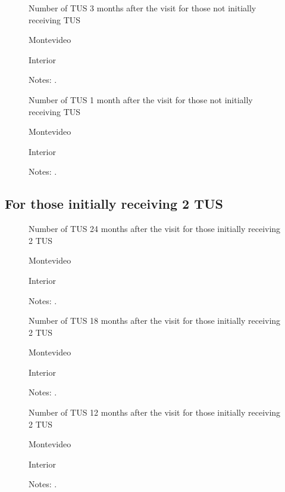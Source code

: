 \documentclass[12pt]{article}
\begin{document}
\begin{figure}[H]%
	\caption{Number of TUS 3 months after the visit for those not initially receiving TUS}%
	\centering
	\caption*{ {Montevideo}}
	\qquad
	\caption*{Interior}
	\label{fig:first_stage_si1Tus_tus3}%
	\caption*{ {\footnotesize Notes: .}}
\end{figure}

\begin{figure}[H]%
	\caption{Number of TUS 1 month after the visit for those not initially receiving TUS}%
	\centering
	\caption*{ {Montevideo}}
	\qquad
	\caption*{Interior}
	\label{fig:first_stage_si1Tus_tus1}%
	\caption*{ {\footnotesize Notes: .}}
\end{figure}

\subsection{For those initially receiving 2 TUS}

\begin{figure}[H]%
	\caption{Number of TUS 24 months after the visit for those initially receiving 2 TUS}%
	\centering
	\caption*{ {Montevideo}}
	\qquad
	\caption*{Interior}
	\label{fig:first_stage_si2Tus_tus24}%
	\caption*{ {\footnotesize Notes: .}}
\end{figure}

\begin{figure}[H]%
	\caption{Number of TUS 18 months after the visit for those initially receiving 2 TUS}%
	\centering
	\caption*{ {Montevideo}}
	\qquad
	\caption*{Interior}
	\label{fig:first_stage_si2Tus_tus18}%
	\caption*{ {\footnotesize Notes: .}}
\end{figure}

\begin{figure}[H]%
	\caption{Number of TUS 12 months after the visit for those initially receiving 2 TUS}%
	\centering
	\caption*{ {Montevideo}}
	\qquad
	\caption*{Interior}
	\label{fig:first_stage_si2Tus_tus12}%
	\caption*{ {\footnotesize Notes: .}}
\end{figure}
\end{document}
